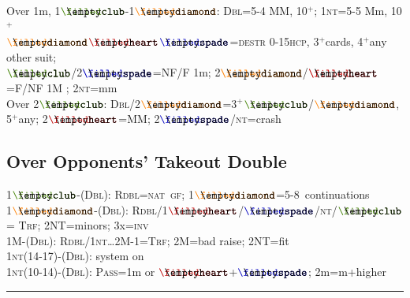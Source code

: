 \documentclass{article}
\newcommand\coloredsuitsymbol[3]{\ensuremath{\mathrel{\raisebox{-0.3pt}{{\color{#1}#2}\llap{#3}}}}}
\newcommand\suitsymbol[3]{\coloredsuitsymbol{#1}{#2}{#3}}%
\newcommand\C{\suitsymbol{clubcolor}{\filledclub}{\emptyclub}}
\newcommand\D{\suitsymbol{diamondcolor}{\filleddiamond}{\emptydiamond}}
\renewcommand\H{\suitsymbol{heartcolor}{\filledheart}{\emptyheart}}
\renewcommand\S{\suitsymbol{spadecolor}{\filledspade}{\emptyspade}}
\newcommand\N{\caps{nt}}
\newcommand\PASS{\caps{Pass}}
\newcommand\X{\caps{Dbl}}
\newcommand\XX{\caps{Rdbl}}
\newcommand\caps[1]{{\scshape#1}}
\newcommand\hcp{\caps{hcp}}
\newcommand\GF{\caps{gf}}
\newcommand\INV{\caps{inv}}
\newcommand\NAT{\caps{nat}}
\newcommand\more{\ensuremath{^+}}
\newcommand{\smallsection}[1]{\vspace{-1ex}\subsection*{#1}\raggedright}
\newcommand{\thinrule}{\rule{\textwidth}{\arrayrulewidth}}
\newcommand{\myendrule}{\vspace{-1.5ex}\thinrule}
\begin{document}
\begin{minipage}[t]{90mm}
	Over 1m, 1\C-1\D: \X=5-4 MM, 10\more; 1\N=5-5 Mm, 10\more\\
	\D\H\S=\caps{destr} 0-15\hcp, 3\more cards, 4\more any other suit;\\
	\C/2\S=NF/F 1m; 2\D/\H=F/NF 1M ; 2\N=mm\\
	Over 2\C: \X/2\D=3\more \C/\D, 5\more any; 2\H=MM; 2\S/\N=crash
\smallsection{Over Opponents' Takeout Double}
	1\C-(\X): \XX=\NAT\ \GF; 1\D=5-8\rightarrow\NAT\ continuations\\
	1\D-(\X): \XX/1\H/\S/\N/\C = \caps{Trf}; 2NT=minors; 3x=\INV \\
	1M-(\X): \XX/1\N\ldots2M-1=\caps{Trf}; 2M=bad raise; 2NT=fit\\
	1\N(14-17)-(\X): system on\\
	1\N(10-14)-(\X): \PASS=1m or \H+\S; 2m=m+higher\\
\myendrule
\end{minipage}
\hfill
\end{document}

